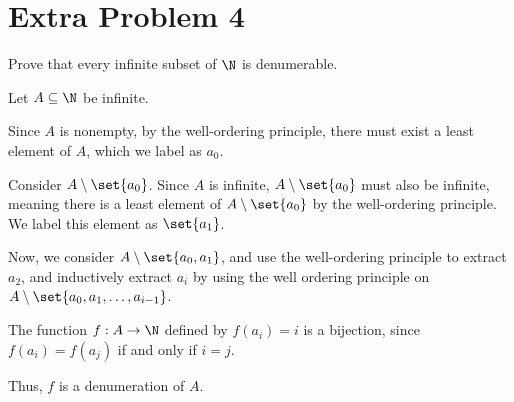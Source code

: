 \documentclass[11pt]{mypackage}
\begin{document}
\section{Extra Problem 4}%
\begin{problem}
  Prove that every infinite subset of $\N$ is denumerable.
\end{problem}
\begin{solution}
  Let $A\subseteq \N$ be infinite.\newline

  Since $A$ is nonempty, by the well-ordering principle, there must exist a least element of $A$, which we label as $a_0$.\newline

  Consider $A\setminus \set{a_0}$. Since $A$ is infinite, $A\setminus \set{a_0}$ must also be infinite, meaning there is a least element of $A\setminus \set{a_0}$ by the well-ordering principle. We label this element as $\set{a_1}$.\newline

  Now, we consider $A\setminus \set{a_0,a_1}$, and use the well-ordering principle to extract $a_2$, and inductively extract $a_i$ by using the well ordering principle on $A\setminus \set{a_0,a_1,\dots,a_{i-1}}$.\newline

  The function $f: A\rightarrow \N$ defined by $f\left(a_i\right) = i$ is a bijection, since $f\left(a_i\right) = f\left(a_j\right)$ if and only if $i = j$.\newline

   Thus, $f$ is a denumeration of $A$.
\end{solution}
\end{document}
